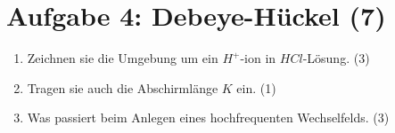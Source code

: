 \section*{Aufgabe 4: Debeye-Hückel (7)}
\begin{enumerate}
\item Zeichnen sie die Umgebung um ein \(H^{+}\)-ion in \(HCl\)-Lösung. (3)

\item Tragen sie auch die Abschirmlänge \(K\) ein. (1)

\item Was passiert beim Anlegen eines hochfrequenten Wechselfelds. (3)
\end{enumerate}